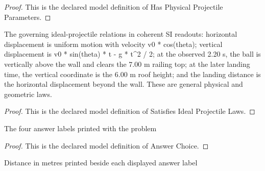 \begin{proof}
  This is the declared model definition of Has Physical Projectile Parameters.
\end{proof}
\begin{definition}
  \label{def:physics:phyx-mini-0685:phyxminiproblems-problemphyxmini0685-satisfiesidealprojectilelaws}
  The governing ideal-projectile relations in coherent SI readouts: horizontal displacement is uniform motion with velocity v0 * cos(theta); vertical displacement is v0 * sin(theta) * t - g * t\textasciicircum{}2 / 2; at the observed 2.20 s, the ball is vertically above the wall and clears the 7.00 m railing top; at the later landing time, the vertical coordinate is the 6.00 m roof height; and the landing distance is the horizontal displacement beyond the wall. These are general physical and geometric laws.
\end{definition}
\begin{proof}
  This is the declared model definition of Satisfies Ideal Projectile Laws.
\end{proof}
\begin{definition}
  \label{def:physics:phyx-mini-0685:phyxminiproblems-problemphyxmini0685-answerchoice}
  The four answer labels printed with the problem
\end{definition}
\begin{proof}
  This is the declared model definition of Answer Choice.
\end{proof}
\begin{definition}
  \label{def:physics:phyx-mini-0685:phyxminiproblems-problemphyxmini0685-answerdistanceinmeters}
  Distance in metres printed beside each displayed answer label
\end{definition}
